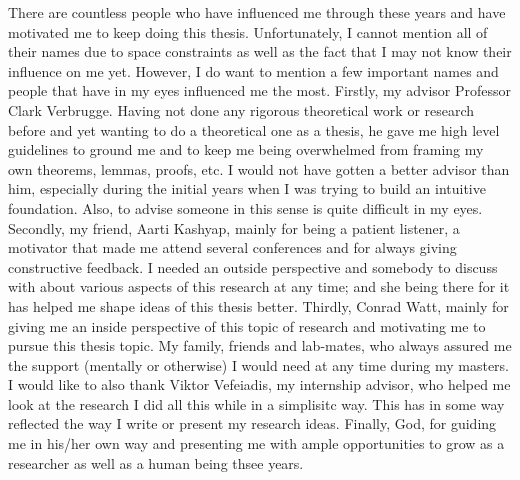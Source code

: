 There are countless people who have influenced me through these years and have motivated me to keep doing this thesis.
Unfortunately, I cannot mention all of their names due to space constraints as well as the fact that I may not know their influence on me yet.
However, I do want to mention a few important names and people that have in my eyes influenced me the most. 
Firstly, my advisor Professor Clark Verbrugge.
Having not done any rigorous theoretical work or research before and yet wanting to do a theoretical one as a thesis, he gave me high level guidelines to ground me and to keep me being overwhelmed from framing my own theorems, lemmas, proofs, etc. 
I would not have gotten a better advisor than him, especially during the initial years when I was trying to build an intuitive foundation. 
Also, to advise someone in this sense is quite difficult in my eyes.
Secondly, my friend, Aarti Kashyap, mainly for being a patient listener, a motivator that made me attend several conferences and for always giving constructive feedback. 
I needed an outside perspective and somebody to discuss with about various aspects of this research at any time; and she being there for it has helped me shape ideas of this thesis better. 
Thirdly, Conrad Watt, mainly for giving me an inside perspective of this topic of research and motivating me to pursue this thesis topic.
My family, friends and lab-mates, who always assured me the support (mentally or otherwise) I would need at any time during my masters. 
I would like to also thank Viktor Vefeiadis, my internship advisor, who helped me look at the research I did all this while in a simplisitc way.
This has in some way reflected the way I write or present my research ideas.
Finally, God, for guiding me in his/her own way and presenting me with ample opportunities to grow as a researcher as well as a human being thsee years.